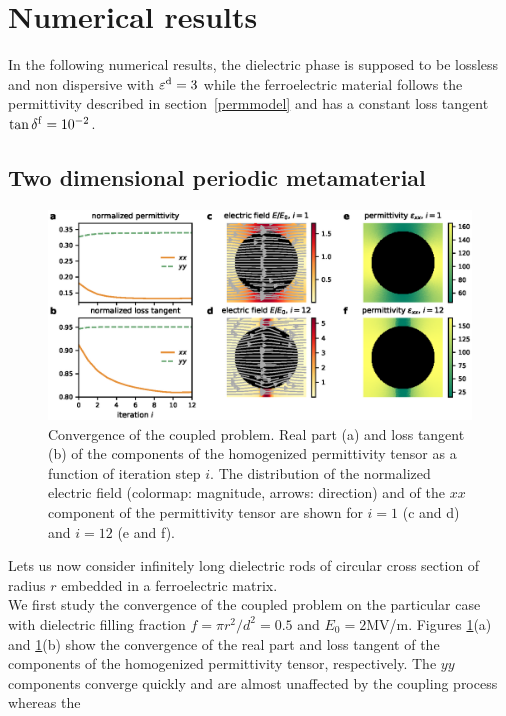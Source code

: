 \documentclass[openacc]{rsproca_new}%
\newcommand{\epsd}{\varepsilon^{\rm d}}
\begin{document}
\section{Numerical results}
In the following numerical results, the dielectric phase is supposed to be
lossless and non dispersive with $\epsd = 3$ while the ferroelectric material follows the
permittivity described in section~\ref{permmodel} and has a constant loss
tangent $\tan \delta^{\rm f} = 10^{-2}$.



\subsection{Two dimensional periodic metamaterial}
\begin{figure}[!t]
 \centering
 \includegraphics[width=1\textwidth]{conv_per}
 \caption{Convergence of the coupled problem.
  Real part (a) and loss tangent (b) of the components of the homogenized
  permittivity tensor as a function of iteration step $i$. The distribution of
  the normalized electric field (colormap: magnitude, arrows: direction) and of the
  $xx$ component of the permittivity tensor are shown for $i=1$
  (c and d) and $i=12$ (e and f).
 }
 \label{conv2D}
\end{figure}
Lets us now consider infinitely long dielectric rods of circular cross section
of radius $r$ embedded in a ferroelectric matrix.\\
We first study the convergence of the coupled problem on the particular case with dielectric
filling fraction $f=\pi r^2/d^2=0.5$ and $E_0=2$MV/m. Figures \ref{conv2D}(a) and \ref{conv2D}(b) show the
convergence of the real part and loss tangent of the components of the homogenized
permittivity tensor, respectively. The $yy$ components converge quickly
and are almost unaffected by the coupling process whereas the
\end{document}
